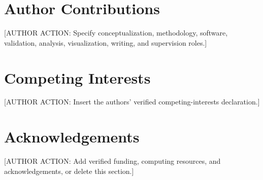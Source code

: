 \documentclass[10pt,twocolumn]{article}
\newcommand{\todoauthor}[1]{\textcolor{red!70!black}{[AUTHOR ACTION: #1]}}
\begin{document}
\section*{Author Contributions}

\todoauthor{Specify conceptualization, methodology, software, validation, analysis, visualization, writing, and supervision roles.}

\section*{Competing Interests}

\todoauthor{Insert the authors' verified competing-interests declaration.}

\section*{Acknowledgements}

\todoauthor{Add verified funding, computing resources, and acknowledgements, or delete this section.}


\begingroup
\scriptsize
\setlength{\bibsep}{0pt}
\balance

\endgroup
\end{document}
